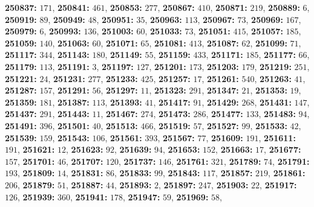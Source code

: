 \textsf{\bfseries 250837:} $171$, \textsf{\bfseries 250841:} $461$, \textsf{\bfseries 250853:} $277$, \textsf{\bfseries 250867:} $410$, \textsf{\bfseries 250871:} $219$, \textsf{\bfseries 250889:} $6$, \textsf{\bfseries 250919:} $89$, \textsf{\bfseries 250949:} $48$, \textsf{\bfseries 250951:} $35$, \textsf{\bfseries 250963:} $113$, \textsf{\bfseries 250967:} $73$, \textsf{\bfseries 250969:} $167$, \textsf{\bfseries 250979:} $6$, \textsf{\bfseries 250993:} $136$, \textsf{\bfseries 251003:} $60$, \textsf{\bfseries 251033:} $73$, \textsf{\bfseries 251051:} $415$, \textsf{\bfseries 251057:} $185$, \textsf{\bfseries 251059:} $140$, \textsf{\bfseries 251063:} $60$, \textsf{\bfseries 251071:} $65$, \textsf{\bfseries 251081:} $413$, \textsf{\bfseries 251087:} $62$, \textsf{\bfseries 251099:} $71$, \textsf{\bfseries 251117:} $344$, \textsf{\bfseries 251143:} $180$, \textsf{\bfseries 251149:} $55$, \textsf{\bfseries 251159:} $433$, \textsf{\bfseries 251171:} $185$, \textsf{\bfseries 251177:} $66$, \textsf{\bfseries 251179:} $113$, \textsf{\bfseries 251191:} $3$, \textsf{\bfseries 251197:} $127$, \textsf{\bfseries 251201:} $173$, \textsf{\bfseries 251203:} $179$, \textsf{\bfseries 251219:} $251$, \textsf{\bfseries 251221:} $24$, \textsf{\bfseries 251231:} $277$, \textsf{\bfseries 251233:} $425$, \textsf{\bfseries 251257:} $17$, \textsf{\bfseries 251261:} $540$, \textsf{\bfseries 251263:} $41$, \textsf{\bfseries 251287:} $157$, \textsf{\bfseries 251291:} $56$, \textsf{\bfseries 251297:} $11$, \textsf{\bfseries 251323:} $291$, \textsf{\bfseries 251347:} $21$, \textsf{\bfseries 251353:} $19$, \textsf{\bfseries 251359:} $181$, \textsf{\bfseries 251387:} $113$, \textsf{\bfseries 251393:} $41$, \textsf{\bfseries 251417:} $91$, \textsf{\bfseries 251429:} $268$, \textsf{\bfseries 251431:} $147$, \textsf{\bfseries 251437:} $291$, \textsf{\bfseries 251443:} $11$, \textsf{\bfseries 251467:} $274$, \textsf{\bfseries 251473:} $286$, \textsf{\bfseries 251477:} $133$, \textsf{\bfseries 251483:} $94$, \textsf{\bfseries 251491:} $396$, \textsf{\bfseries 251501:} $40$, \textsf{\bfseries 251513:} $466$, \textsf{\bfseries 251519:} $57$, \textsf{\bfseries 251527:} $99$, \textsf{\bfseries 251533:} $42$, \textsf{\bfseries 251539:} $159$, \textsf{\bfseries 251543:} $106$, \textsf{\bfseries 251561:} $393$, \textsf{\bfseries 251567:} $77$, \textsf{\bfseries 251609:} $191$, \textsf{\bfseries 251611:} $191$, \textsf{\bfseries 251621:} $12$, \textsf{\bfseries 251623:} $92$, \textsf{\bfseries 251639:} $94$, \textsf{\bfseries 251653:} $152$, \textsf{\bfseries 251663:} $17$, \textsf{\bfseries 251677:} $157$, \textsf{\bfseries 251701:} $46$, \textsf{\bfseries 251707:} $120$, \textsf{\bfseries 251737:} $146$, \textsf{\bfseries 251761:} $321$, \textsf{\bfseries 251789:} $74$, \textsf{\bfseries 251791:} $193$, \textsf{\bfseries 251809:} $14$, \textsf{\bfseries 251831:} $86$, \textsf{\bfseries 251833:} $99$, \textsf{\bfseries 251843:} $117$, \textsf{\bfseries 251857:} $219$, \textsf{\bfseries 251861:} $206$, \textsf{\bfseries 251879:} $51$, \textsf{\bfseries 251887:} $44$, \textsf{\bfseries 251893:} $2$, \textsf{\bfseries 251897:} $247$, \textsf{\bfseries 251903:} $22$, \textsf{\bfseries 251917:} $126$, \textsf{\bfseries 251939:} $360$, \textsf{\bfseries 251941:} $178$, \textsf{\bfseries 251947:} $59$, \textsf{\bfseries 251969:} $58$, 
